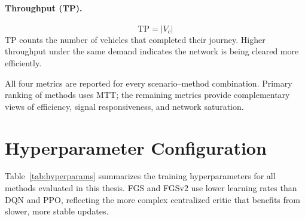 \paragraph{Throughput (TP).}
\begin{equation}
  \mathrm{TP} = |V_c|
  \label{eq:throughput}
\end{equation}
TP counts the number of vehicles that completed their journey. Higher throughput under the same demand indicates the network is being cleared more efficiently.

All four metrics are reported for every scenario--method combination. Primary ranking of methods uses MTT; the remaining metrics provide complementary views of efficiency, signal responsiveness, and network saturation.

\section{Hyperparameter Configuration}
\label{sec:ExperimentalDesign_Hyperparameters}

Table~\ref{tab:hyperparams} summarizes the training hyperparameters for all methods evaluated in this thesis. FGS and FGSv2 use lower learning rates than DQN and PPO, reflecting the more complex centralized critic that benefits from slower, more stable updates.

